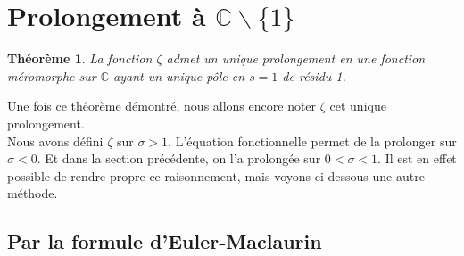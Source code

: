 \documentclass[french]{report}
\newtheorem{theorem}{Théorème}[section]
\begin{document}
\section{Prolongement à $\mathbb{C}\backslash\{1\}$}

\begin{theorem}
  La fonction $\zeta$ admet un unique prolongement en une fonction méromorphe sur $\mathbb{C}$ ayant un unique pôle en $s=1$ de résidu 1.
\end{theorem}

Une fois ce théorème démontré, nous allons encore noter $\zeta$ cet unique prolongement.
\\

Nous avons défini $\zeta$ sur $\sigma>1$. L'équation fonctionnelle permet de la prolonger sur $\sigma<0$. Et dans la section précédente, on l'a prolongée sur $0<\sigma<1$. Il est en effet possible de rendre propre ce raisonnement, mais voyons ci-dessous une autre méthode.

\subsection{Par la formule d'Euler-Maclaurin}
\end{document}
